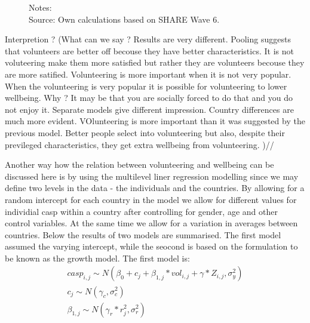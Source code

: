 \documentclass[10pt, letterpaper]{article}
\begin{document}
\begin{spacing}{1.4}
\begin{figure}[H]
\begin{minipage}{1\linewidth}
{\footnotesize Notes: }~\\
{\footnotesize Source: Own calculations based on SHARE Wave 6.}
\end{minipage}
\end{figure} 
   
Interpretion ? (What can we say ? Results are very different. Pooling suggests that volunteers are better off becouse they have better characteristics. It is not voluteering make them more satisfied but rather they are volunteers becouse they are more satified. Volunteering is more important when it is not very popular. When the volunteering is very popular it is possible for volunteering to lower wellbeing. Why ? It may be that you are socially forced to do that and you do not enjoy it. Separate models give different impression. Country differences are much more evident. VOlunteering is more important than it was suggested by the previous model. Better people select into volunteering but also, despite their previleged characteristics, they get extra wellbeing from volunteering. )//



Another way how the relation between volunteering and wellbeing can be discussed here is by using the multilevel liner regression modelling since we may define two levels in the data  - the individuals and the countries. By allowing for a random intercept for each country in the model we allow for different values for individial casp within a country after controlling for gender, age and other control variables. At the same time we allow for a variation in averages between countries.  Below the results of two models are summarised. The first model assumed the varying intercept, while the seocond is based on the formulation to be known as the growth model. The first model is: \\


 \begin{eqnarray}
	casp_{i,j}\sim N(\beta_{0}+ c_{j} +  \beta_{1,j} * vol_{i,j}+\gamma*Z_{i,j},\sigma^{2}_{y}) \\	
	c_{j} \sim N(\gamma_{c},\sigma^{2}_{c}) \\
	\beta_{1,j} \sim N(\gamma_{r}*r^{2}_{j},\sigma^{2}_{r})
 \end{eqnarray}


%
%
%


\end{spacing}
\end{document}
